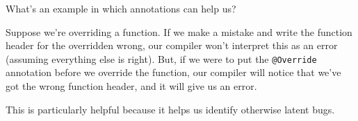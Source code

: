What's an example in which annotations can help us?

Suppose we're overriding a function. If we make a mistake and write the function header for the overridden wrong, our compiler won't interpret this as an error (assuming everything else is right). But, if we were to put the \verb!@Override! annotation before we override the function, our compiler will notice that we've got the wrong function header, and it will give us an error. 

This is particularly helpful because it helps us identify otherwise latent bugs.